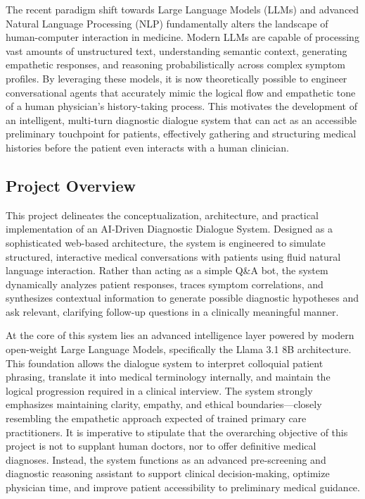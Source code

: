 \documentclass[12pt]{article}
\begin{document}
The recent paradigm shift towards Large Language Models (LLMs) and advanced Natural Language Processing (NLP) fundamentally alters the landscape of human-computer interaction in medicine. Modern LLMs are capable of processing vast amounts of unstructured text, understanding semantic context, generating empathetic responses, and reasoning probabilistically across complex symptom profiles. By leveraging these models, it is now theoretically possible to engineer conversational agents that accurately mimic the logical flow and empathetic tone of a human physician's history-taking process. This motivates the development of an intelligent, multi-turn diagnostic dialogue system that can act as an accessible preliminary touchpoint for patients, effectively gathering and structuring medical histories before the patient even interacts with a human clinician.

\subsection{Project Overview}
This project delineates the conceptualization, architecture, and practical implementation of an AI-Driven Diagnostic Dialogue System. Designed as a sophisticated web-based architecture, the system is engineered to simulate structured, interactive medical conversations with patients using fluid natural language interaction. Rather than acting as a simple Q\&A bot, the system dynamically analyzes patient responses, traces symptom correlations, and synthesizes contextual information to generate possible diagnostic hypotheses and ask relevant, clarifying follow-up questions in a clinically meaningful manner.

At the core of this system lies an advanced intelligence layer powered by modern open-weight Large Language Models, specifically the Llama 3.1 8B architecture. This foundation allows the dialogue system to interpret colloquial patient phrasing, translate it into medical terminology internally, and maintain the logical progression required in a clinical interview. The system strongly emphasizes maintaining clarity, empathy, and ethical boundaries—closely resembling the empathetic approach expected of trained primary care practitioners. It is imperative to stipulate that the overarching objective of this project is not to supplant human doctors, nor to offer definitive medical diagnoses. Instead, the system functions as an advanced pre-screening and diagnostic reasoning assistant to support clinical decision-making, optimize physician time, and improve patient accessibility to preliminary medical guidance.
\end{document}

